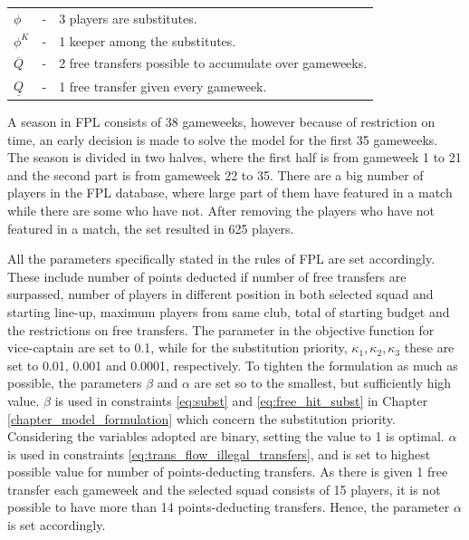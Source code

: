 \begin{table}[H]
\begin{tabular}{@{}lll@{}}
$\phi$                         & - & 3 players are substitutes.                                                         \\
$\phi^{K}$                   & - & 1 keeper among the substitutes.                                                          \\
$\overline{Q}$                   & - & 2 free transfers possible to accumulate over gameweeks.                                              \\
$\underline{Q}$                  & - & 1 free transfer given every gameweek.                                      \\ \bottomrule
\end{tabular}
\label{tab:initialization_of_parameters}
\end{table}

 
A season in FPL consists of 38 gameweeks, however because of restriction on time, an early decision is made to solve the model for the first 35 gameweeks. The season is divided in two halves, where the first half is from gameweek 1 to 21 and the second part is from gameweek 22 to 35. There are a big number of players in the FPL database, where large part of them have featured in a match while there are some who have not. After removing the players who have not featured in a match, the set resulted in 625 players. 

\newpar

All the parameters specifically stated in the rules of FPL are set accordingly. These include number of points deducted if number of free transfers are surpassed, number of players in different position in both selected squad and starting line-up, maximum players from same club, total of starting budget and the restrictions on free transfers. The parameter in the objective function for vice-captain are set to 0.1, while for the substitution priority, $\kappa_{1}, \kappa_{2}, \kappa_{3}$ these are set to 0.01, 0.001 and 0.0001, respectively. To tighten the formulation as much as possible, the parameters $\beta$ and $\alpha$ are set so to the smallest, but sufficiently high value. $\beta$ is used in constraints \eqref{eq:subst} and \eqref{eq:free_hit_subst} in Chapter \ref{chapter_model_formulation} which concern the substitution priority. Considering the variables adopted are binary, setting the value to 1 is optimal. $\alpha$ is used in constraints \eqref{eq:trans_flow_illegal_transfers}, and is set to highest possible value for number of points-deducting transfers. As there is given 1 free transfer each gameweek and the selected squad consists of 15 players, it is not possible to have more than 14 points-deducting transfers. Hence, the parameter $\alpha$ is set accordingly. 

